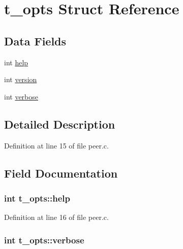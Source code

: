 \hypertarget{structt__opts}{\section{t\-\_\-opts Struct Reference}
\label{structt__opts}
}
\subsection*{Data Fields}
\begin{DoxyCompactItemize}
\item 
int \hyperlink{structt__opts_a747f9f2e2fdcfedd7010f0ed6999da01}{help}
\item 
int \hyperlink{structt__opts_a678ae91135fbeaf408cc1ca4ee076202}{version}
\item 
int \hyperlink{structt__opts_a9f3b9c47e2331ab48fdfb60db14f18bf}{verbose}
\end{DoxyCompactItemize}


\subsection{Detailed Description}


Definition at line 15 of file peer.\-c.



\subsection{Field Documentation}
\hypertarget{structt__opts_a747f9f2e2fdcfedd7010f0ed6999da01}{
\subsubsection[{help}]{\setlength{\rightskip}{0pt plus 5cm}int t\-\_\-opts\-::help}}\label{structt__opts_a747f9f2e2fdcfedd7010f0ed6999da01}


Definition at line 16 of file peer.\-c.

\hypertarget{structt__opts_a9f3b9c47e2331ab48fdfb60db14f18bf}{
\subsubsection[{verbose}]{\setlength{\rightskip}{0pt plus 5cm}int t\-\_\-opts\-::verbose}}\label{structt__opts_a9f3b9c47e2331ab48fdfb60db14f18bf}


